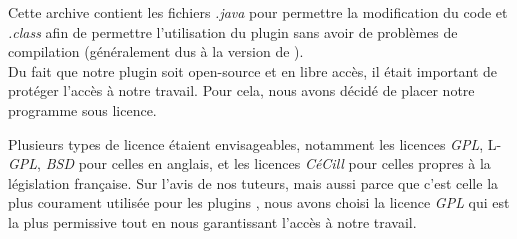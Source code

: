 Cette archive contient les fichiers \emph{.java} pour permettre la modification du code et  \emph{.class} afin de permettre l'utilisation du plugin sans avoir de problèmes de compilation (généralement dus à la version de \java ). \\

Du fait que notre plugin soit open-source et en libre accès, il était important de protéger l'accès à notre travail. Pour cela, nous avons décidé de placer notre programme sous licence.

Plusieurs types de licence étaient envisageables, notamment les licences \emph{GPL}, L-\emph{GPL}, \emph{BSD} pour celles en anglais, et les licences \emph{CéCill} pour celles propres à la législation française. Sur l'avis de nos tuteurs, mais aussi parce que c'est celle la plus courament utilisée pour les plugins \imj , nous avons choisi la licence \emph{GPL} qui est la plus permissive tout en nous garantissant l'accès à notre travail.
%

